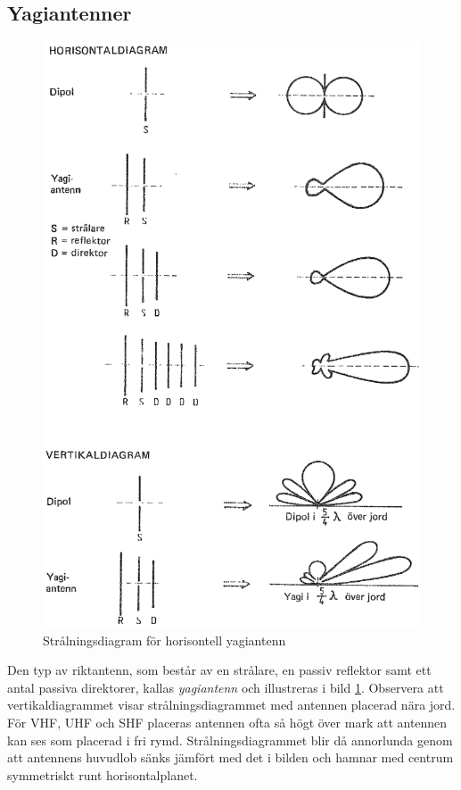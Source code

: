\subsection{Yagiantenner}

\begin{figure}
  \includegraphics[width=\textwidth]{images/cropped_pdfs/bild_2_6-20.pdf}
  \caption{Strålningsdiagram för horisontell yagiantenn}
  \label{fig:bildII6-20}
\end{figure}

Den typ av riktantenn, som består av en strålare, en passiv reflektor
samt ett antal passiva direktorer, kallas \emph{yagiantenn} och illustreras i
bild \ref{fig:bildII6-20}.
Observera att vertikaldiagrammet visar strålningsdiagrammet med antennen
placerad nära jord.
För VHF, UHF och SHF placeras antennen ofta så högt över mark att antennen kan
ses som placerad i fri rymd.
Strålningsdiagrammet blir då annorlunda genom att antennens huvudlob sänks jämfört
med det i bilden och hamnar med centrum symmetriskt runt horisontalplanet.

